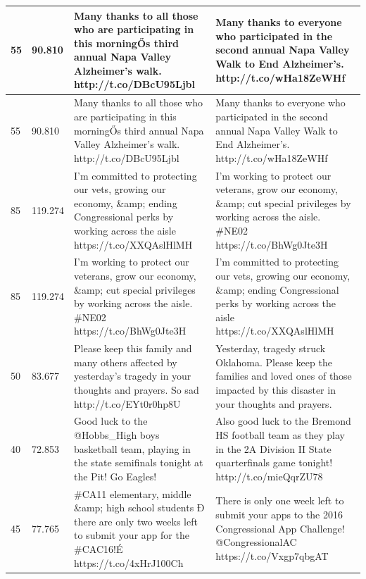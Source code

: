 {\begin{table}[]
\begin{tabular}{|p{}|p{}|p{}|p{}|}
55       & 90.810                      & Many thanks to all those who are participating in this morningŐs third annual Napa Valley Alzheimer's walk. http://t.co/DBcU95Ljbl                      & Many thanks to everyone who participated in the second annual Napa Valley Walk to End Alzheimer's. http://t.co/wHa18ZeWHf                           \\ \hline
55       & 90.810                      & Many thanks to all those who are participating in this morningŐs third annual Napa Valley Alzheimer's walk. http://t.co/DBcU95Ljbl                      & Many thanks to everyone who participated in the second annual Napa Valley Walk to End Alzheimer's. http://t.co/wHa18ZeWHf                           \\ \hline
85       & 119.274                     & I'm committed to protecting our vets, growing our economy, \&amp; ending Congressional perks by working across the aisle https://t.co/XXQAslHlMH        & I'm working to protect our veterans, grow our economy, \&amp; cut special privileges by working across the aisle. \#NE02 https://t.co/BhWg0Jte3H    \\ \hline
85       & 119.274                     & I'm working to protect our veterans, grow our economy, \&amp; cut special privileges by working across the aisle. \#NE02 https://t.co/BhWg0Jte3H        & I'm committed to protecting our vets, growing our economy, \&amp; ending Congressional perks by working across the aisle https://t.co/XXQAslHlMH    \\ \hline
50       & 83.677                      & Please keep this family and many others affected by yesterday's tragedy in your thoughts and prayers. So sad  http://t.co/EYt0r0hp8U                    & Yesterday, tragedy struck Oklahoma. Please keep the families and loved ones of those impacted by this disaster in your thoughts and prayers.        \\ \hline
40       & 72.853                      & Good luck to the @Hobbs\_High boys basketball team, playing in the state semifinals tonight at the Pit!  Go Eagles!                                     & Also good luck to the Bremond HS football team as they play in the 2A Division II State quarterfinals game tonight! http://t.co/mieQqrZU78          \\ \hline
45       & 77.765                      & \#CA11 elementary, middle \&amp; high school students Đ there are only two weeks left to submit your app for the \#CAC16!É https://t.co/4xHrJ100Ch      & There is only one week left to submit your apps to the 2016 Congressional App Challenge! @CongressionalAC https://t.co/Vxgp7qbgAT                   \\ \hline

\end{tabular}
\end{table}}
